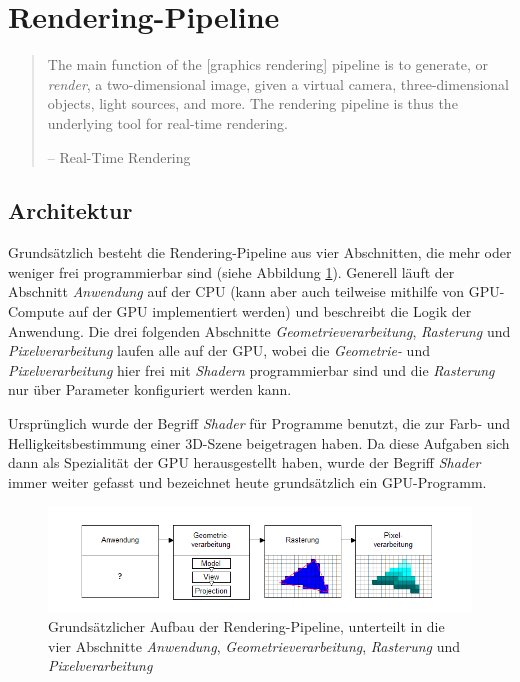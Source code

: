 \documentclass[oneside]{ausarbeitung}
\begin{document}
\section{Rendering-Pipeline \cite[Vgl.][The Graphics Rendering Pipeline]{real_time_rendering}}
\label{sec:render_pipeline}
\begin{quote}
The main function of the [graphics rendering] pipeline is to generate, or \textit{render}, a two-dimensional image, given a virtual camera, three-dimensional objects, light sources, and more. The rendering pipeline is thus the underlying tool for real-time rendering.

-- Real-Time Rendering \cite[S. 11]{real_time_rendering}
\end{quote}

\subsection{Architektur}
Grundsätzlich besteht die Rendering-Pipeline aus vier Abschnitten, die mehr oder weniger frei programmierbar sind (siehe Abbildung \ref{fig:render_pipeline}). Generell läuft der Abschnitt \textit{Anwendung} auf der \ac{CPU} (kann aber auch teilweise mithilfe von \ac{GPU}-Compute auf der \ac{GPU} implementiert werden) und beschreibt die Logik der Anwendung. Die drei folgenden Abschnitte \textit{Geometrieverarbeitung}, \textit{Rasterung} und \textit{Pixelverarbeitung} laufen alle auf der \ac{GPU}, wobei die \textit{Geometrie-} und \textit{Pixelverarbeitung} hier frei mit \textit{Shadern} programmierbar sind und die \textit{Rasterung} nur über Parameter konfiguriert werden kann.

Ursprünglich wurde der Begriff \textit{Shader} für Programme benutzt, die zur Farb- und Helligkeitsbestimmung einer 3D-Szene beigetragen haben. Da diese Aufgaben sich dann als Spezialität der \ac{GPU} herausgestellt haben, wurde der Begriff \textit{Shader} immer weiter gefasst und bezeichnet heute grundsätzlich ein \ac{GPU}-Programm.

\begin{figure}
    \includegraphics[width=\textwidth]{images/render_pipeline.png}
    \caption{Grundsätzlicher Aufbau der Rendering-Pipeline, unterteilt in die vier Abschnitte \textit{Anwendung}, \textit{Geometrieverarbeitung}, \textit{Rasterung} und \textit{Pixelverarbeitung}}
    \label{fig:render_pipeline}
\end{figure}
\end{document}
